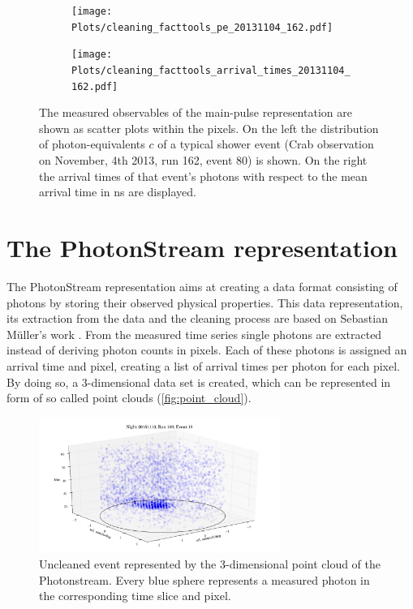 \begin{figure}
  \begin{subfigure}{0.475\textwidth}
    \texttt{[image: Plots/cleaning\_facttools\_pe\_20131104\_162.pdf]}
  \end{subfigure}
  \begin{subfigure}{0.475\textwidth}
    \texttt{[image: Plots/cleaning\_facttools\_arrival\_times\_20131104\_162.pdf]}
  \end{subfigure}
  \caption{The measured observables of the main-pulse representation are shown as scatter plots within the pixels. On the left the distribution of photon-equivalents $c$ of a typical shower event (Crab observation on November, 4th 2013, run 162, event 80) is shown. On the right the arrival times of that event's photons with respect to the mean arrival time in ns are displayed.}
  \label{fig:mainpulse}
\end{figure}

\section{The PhotonStream representation}
\label{sec:phs}
%
The PhotonStream representation aims at creating a data format consisting of photons by storing their observed physical properties. This data representation, its extraction from the data and the cleaning process are based on Sebastian Müller's work \cite{sebastian, photonstream, phs}. From the measured time series single photons are extracted instead of deriving photon counts in pixels. Each of these photons is assigned an arrival time and pixel, creating a list of arrival times per photon for each pixel. By doing so, a 3-dimensional data set is created, which can be represented in form of so called point clouds (\autoref{fig:point_cloud}).
%
\begin{figure}
  \centering
  \includegraphics[width=0.7\textwidth]{Plots/event2.png}
  \caption{Uncleaned event represented by the 3-dimensional point cloud of the Photonstream. Every blue sphere represents a measured photon in the corresponding time slice and pixel.}
  \label{fig:point_cloud}
\end{figure}
%
